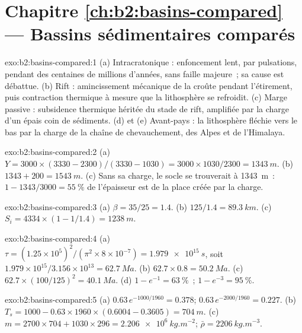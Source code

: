 \section*{Chapitre \ref{ch:b2:basins-compared} --- Bassins sédimentaires comparés}

\begin{solution}{exo:b2:basins-compared:1}
(a) Intracratonique : enfoncement lent, par pulsations, pendant des centaines de millions d'années, sans faille
majeure~; sa cause est débattue. (b) Rift : amincissement mécanique de la croûte pendant l'étirement, puis
contraction thermique à mesure que la lithosphère se refroidit. (c) Marge passive : subsidence thermique héritée du stade de rift,
amplifiée par la charge d'un épais coin de sédiments. (d) et (e) Avant-pays : la lithosphère fléchie vers le bas par la charge
de la chaîne de chevauchement, des Alpes et de l'Himalaya.
\end{solution}

\begin{solution}{exo:b2:basins-compared:2}
(a) $Y = 3000\times(3330 - 2300)/(3330 - 1030) = 3000\times1030/2300 = \qty{1343}{m}$.
(b) $1343 + 200 = \qty{1543}{m}$. (c) Sans sa charge, le socle se trouverait à \qty{1343}{m}~:
$1 - 1343/3000 = \qty{55}{\percent}$ de l'épaisseur est de la place créée par la charge.
\end{solution}

\begin{solution}{exo:b2:basins-compared:3}
(a) $\beta = 35/25 = 1.4$. (b) $125/1.4 = \qty{89.3}{km}$. (c) $S_i = 4334\times(1 - 1/1.4) =
\qty{1238}{m}$.
\end{solution}

\begin{solution}{exo:b2:basins-compared:4}
(a) $\tau = (1.25\times10^{5})^2/(\pi^2\times8\times10^{-7}) = \qty{1.979e15}{s}$, soit
$1.979\times10^{15}/3.156\times10^{13} = \qty{62.7}{Ma}$. (b) $62.7\times0.8 = \qty{50.2}{Ma}$.
(c) $62.7\times(100/125)^2 = \qty{40.1}{Ma}$. (d) $1 - e^{-1} = \qty{63}{\percent}$~; $1 -
e^{-3} = \qty{95}{\percent}$.
\end{solution}

\begin{solution}{exo:b2:basins-compared:5}
(a) $0.63\,e^{-1000/1960} = 0.378$; $0.63\,e^{-2000/1960} = 0.227$. (b) $T_s = 1000 -
0.63\times1960\times(0.6004 - 0.3605) = \qty{704}{m}$. (c) $m = 2700\times704 + 1030\times296 =
\qty{2.206e6}{kg.m^{-2}}$; $\bar\rho = \qty{2206}{kg.m^{-3}}$.
\end{solution}

